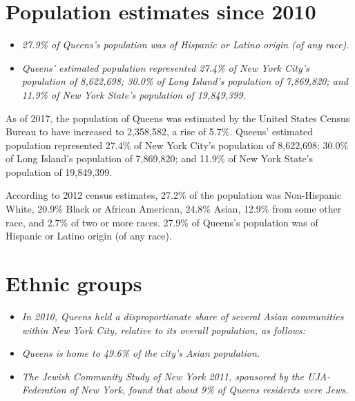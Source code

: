 \section{Population estimates since
2010}\label{population-estimates-since-2010}

\begin{itemize}
\item
  \emph{27.9\% of Queens's population was of Hispanic or Latino origin
  (of any race).}
\item
  \emph{Queens' estimated population represented 27.4\% of New York
  City's population of 8,622,698; 30.0\% of Long Island's population of
  7,869,820; and 11.9\% of New York State's population of 19,849,399.}
\end{itemize}

As of 2017, the population of Queens was estimated by the United States
Census Bureau to have increased to 2,358,582, a rise of 5.7\%. Queens'
estimated population represented 27.4\% of New York City's population of
8,622,698; 30.0\% of Long Island's population of 7,869,820; and 11.9\%
of New York State's population of 19,849,399.

According to 2012 census estimates, 27.2\% of the population was
Non-Hispanic White, 20.9\% Black or African American, 24.8\% Asian,
12.9\% from some other race, and 2.7\% of two or more races. 27.9\% of
Queens's population was of Hispanic or Latino origin (of any race).

\section{Ethnic groups}\label{ethnic-groups}

\begin{itemize}
\item
  \emph{In 2010, Queens held a disproportionate share of several Asian
  communities within New York City, relative to its overall population,
  as follows:}
\item
  \emph{Queens is home to 49.6\% of the city's Asian population.}
\item
  \emph{The Jewish Community Study of New York 2011, sponsored by the
  UJA-Federation of New York, found that about 9\% of Queens residents
  were Jews.}
\end{itemize}


